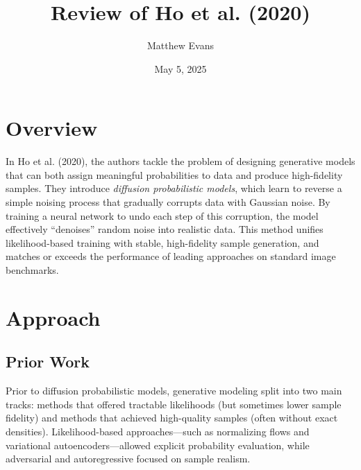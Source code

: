 \documentclass[10pt]{article}
\title{
    Review of Ho et al. (2020) \\
}
\author{Matthew Evans}
\date{May 5, 2025}
\begin{document}
\maketitle

\section*{Overview}
In Ho et al. (2020), the authors \cite{NEURIPS2020_4c5bcfec} tackle the problem of designing generative models that can both assign meaningful probabilities to data and produce high-fidelity samples. They introduce \emph{diffusion probabilistic models}, which learn to reverse a simple noising process that gradually corrupts data with Gaussian noise. By training a neural network to undo each step of this corruption, the model effectively ``denoises'' random noise into realistic data. This method unifies likelihood-based training with stable, high-fidelity sample generation, and matches or exceeds the performance of leading approaches on standard image benchmarks.

\section*{Approach}
\subsection*{Prior Work}
Prior to diffusion probabilistic models, generative modeling split into two main tracks: methods that offered tractable likelihoods (but sometimes lower sample fidelity) and methods that achieved high-quality samples (often without exact densities). Likelihood-based approaches—such as normalizing flows and variational autoencoders—allowed explicit probability evaluation, while adversarial and autoregressive focused on sample realism.
\end{document}
